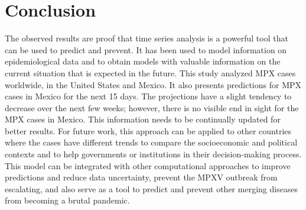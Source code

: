 \documentclass[conference]{IEEEtran}
\begin{document}
\section{Conclusion}
The observed results are proof that time series analysis is a powerful tool that can be used to predict and prevent. It has been used to model information on epidemiological data and to obtain models with valuable information on the current situation that is expected in the future. This study analyzed MPX cases worldwide, in the United States and Mexico. It also presents predictions for MPX cases in Mexico for the next 15 days. The projections have a slight tendency to decrease over the next few weeks; however, there is no visible end in sight for the MPX cases in Mexico. This information needs to be continually updated for better results. For future work, this approach can be applied to other countries where the cases have different trends to compare the socioeconomic and political contexts and to help governments or institutions in their decision-making process. This model can be integrated with other computational approaches to improve predictions and reduce data uncertainty, prevent the MPXV outbreak from escalating, and also serve as a tool to predict and prevent other merging diseases from becoming a brutal pandemic. 



\end{document}
